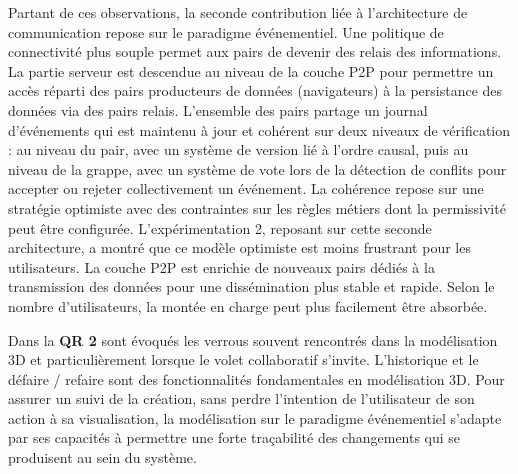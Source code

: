 Partant de ces observations, la seconde contribution liée à l'architecture de 
communication repose sur le paradigme événementiel. Une politique de 
connectivité plus souple  permet aux pairs de devenir des relais des informations. La 
partie serveur est \og descendue\fg{} au niveau de la couche \gls{P2P} pour 
permettre un accès réparti des pairs producteurs de données (navigateurs) à la
persistance des données via des pairs relais. L'ensemble des pairs partage un 
journal d'événements qui est maintenu à jour et cohérent sur deux niveaux de 
vérification : au niveau du pair, avec un système de version lié à l'ordre causal, 
puis au niveau de la grappe, avec un système de vote lors de la détection de 
conflits pour accepter ou rejeter collectivement un événement. La cohérence 
repose sur une stratégie optimiste avec des contraintes sur les règles métiers 
dont la permissivité peut être configurée.
L'expérimentation 2, reposant sur cette seconde architecture, a montré que ce 
modèle optimiste est moins frustrant pour les utilisateurs. La couche \gls{P2P} est 
enrichie de nouveaux pairs dédiés à la transmission des données pour 
une dissémination plus stable et rapide. Selon le nombre d'utilisateurs, la montée 
en charge peut plus facilement être absorbée.



Dans la \textbf{QR 2} sont évoqués les verrous souvent rencontrés dans la 
modélisation 3D et particulièrement lorsque le volet collaboratif s'invite. 
L'historique et le \og défaire / refaire\fg{} sont des fonctionnalités fondamentales en 
modélisation 3D. Pour assurer un suivi de la création, sans perdre l'intention de 
l'utilisateur de son action à sa visualisation, la modélisation sur le paradigme 
événementiel s'adapte par ses capacités à permettre une forte traçabilité des 
changements qui se produisent au sein du système. 

